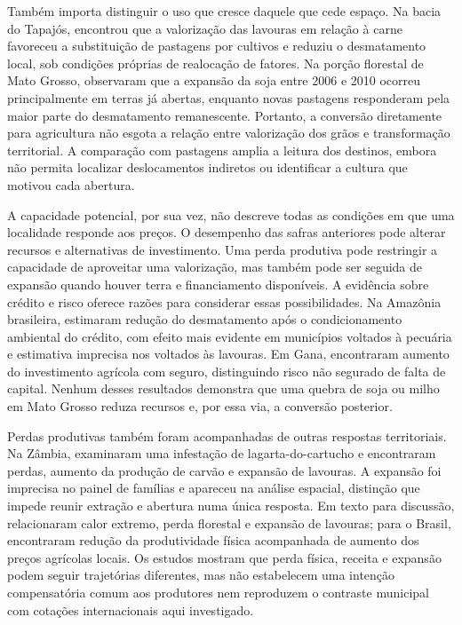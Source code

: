 Também importa distinguir o uso que cresce daquele que cede espaço. Na bacia do Tapajós,  encontrou que a valorização das lavouras em relação à carne favoreceu a substituição de pastagens por cultivos e reduziu o desmatamento local, sob condições próprias de realocação de fatores. Na porção florestal de Mato Grosso,  observaram que a expansão da soja entre 2006 e 2010 ocorreu principalmente em terras já abertas, enquanto novas pastagens responderam pela maior parte do desmatamento remanescente. Portanto, a conversão diretamente para agricultura não esgota a relação entre valorização dos grãos e transformação territorial. A comparação com pastagens amplia a leitura dos destinos, embora não permita localizar deslocamentos indiretos ou identificar a cultura que motivou cada abertura.

A capacidade potencial, por sua vez, não descreve todas as condições em que uma localidade responde aos preços. O desempenho das safras anteriores pode alterar recursos e alternativas de investimento. Uma perda produtiva pode restringir a capacidade de aproveitar uma valorização, mas também pode ser seguida de expansão quando houver terra e financiamento disponíveis. A evidência sobre crédito e risco oferece razões para considerar essas possibilidades. Na Amazônia brasileira,  estimaram redução do desmatamento após o condicionamento ambiental do crédito, com efeito mais evidente em municípios voltados à pecuária e estimativa imprecisa nos voltados às lavouras. Em Gana,  encontraram aumento do investimento agrícola com seguro, distinguindo risco não segurado de falta de capital. Nenhum desses resultados demonstra que uma quebra de soja ou milho em Mato Grosso reduza recursos e, por essa via, a conversão posterior.

Perdas produtivas também foram acompanhadas de outras respostas territoriais. Na Zâmbia,  examinaram uma infestação de lagarta-do-cartucho e encontraram perdas, aumento da produção de carvão e expansão de lavouras. A expansão foi imprecisa no painel de famílias e apareceu na análise espacial, distinção que impede reunir extração e abertura numa única resposta. Em texto para discussão,  relacionaram calor extremo, perda florestal e expansão de lavouras; para o Brasil, encontraram redução da produtividade física acompanhada de aumento dos preços agrícolas locais. Os estudos mostram que perda física, receita e expansão podem seguir trajetórias diferentes, mas não estabelecem uma intenção compensatória comum aos produtores nem reproduzem o contraste municipal com cotações internacionais aqui investigado.

